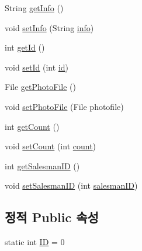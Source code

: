 \begin{DoxyCompactItemize}
String \hyperlink{classpkg_1_1_product_a9609730b224bee5730f554067811446f}{get\+Info} ()
\item 
void \hyperlink{classpkg_1_1_product_a1e1baf71e00cde4a2ef6c36ec807b697}{set\+Info} (String \hyperlink{classpkg_1_1_product_ade3d909a0e7d15ec98c2f27eecd637cd}{info})
\item 
int \hyperlink{classpkg_1_1_product_a2f65335afe35080fa3402838b17d092e}{get\+Id} ()
\item 
void \hyperlink{classpkg_1_1_product_a996243e4823ae5f76f58e30a03d34eb9}{set\+Id} (int \hyperlink{classpkg_1_1_product_ac7846687b2d11faba3be1395fcbbab72}{id})
\item 
File \hyperlink{classpkg_1_1_product_a764578798cef5634d2af3044ab922977}{get\+Photo\+File} ()
\item 
void \hyperlink{classpkg_1_1_product_a5e82724d52edee89a9d1b27c10ef6c40}{set\+Photo\+File} (File photofile)
\item 
int \hyperlink{classpkg_1_1_product_ab7dd82a1b245dba43a64cd232f3665f6}{get\+Count} ()
\item 
void \hyperlink{classpkg_1_1_product_acb0a299e85f03854235433410489ab66}{set\+Count} (int \hyperlink{classpkg_1_1_product_ac136af1e8637edc22218dd9c3383266b}{count})
\item 
int \hyperlink{classpkg_1_1_product_a5f82183f3895907190290282addf4b93}{get\+Salesman\+ID} ()
\item 
void \hyperlink{classpkg_1_1_product_ac88412453ad90154a2ce712df900149f}{set\+Salesman\+ID} (int \hyperlink{classpkg_1_1_product_aecf411b201022fca17571e9afbc76747}{salesman\+ID})
\end{DoxyCompactItemize}
\subsection*{정적 Public 속성}
\begin{DoxyCompactItemize}
\item 
static int \hyperlink{classpkg_1_1_product_a228b3c9d89ad6a4f6637bf1f6f74ff64}{ID} = 0
\end{DoxyCompactItemize}
